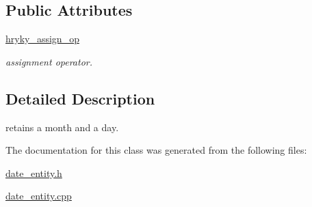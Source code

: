 \subsection*{Public Attributes}
\begin{DoxyCompactItemize}
\item 
\hypertarget{classhryky_1_1date_1_1_entity_ac854dbb72ca5a3245dddc714f6edb537}{\hyperlink{classhryky_1_1date_1_1_entity_ac854dbb72ca5a3245dddc714f6edb537}{hryky\-\_\-assign\-\_\-op}}\label{classhryky_1_1date_1_1_entity_ac854dbb72ca5a3245dddc714f6edb537}

\begin{DoxyCompactList}\small\item\em assignment operator. \end{DoxyCompactList}\end{DoxyCompactItemize}


\subsection{Detailed Description}
retains a month and a day. 

The documentation for this class was generated from the following files\-:\begin{DoxyCompactItemize}
\item 
\hyperlink{date__entity_8h}{date\-\_\-entity.\-h}\item 
\hyperlink{date__entity_8cpp}{date\-\_\-entity.\-cpp}\end{DoxyCompactItemize}
